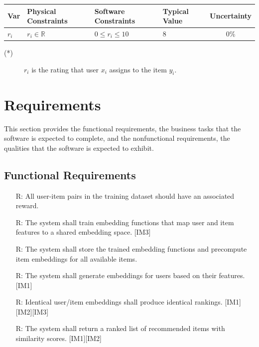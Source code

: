 \documentclass[12pt]{article}
\newcounter{reqnum} %
\begin{document}
\begin{table}[!h]
  \caption{Input Variables} \label{TblInputVar}
  \renewcommand{\arraystretch}{1.2}
\noindent \begin{longtable*}{l l l l c} 
  \toprule
  \textbf{Var} & \textbf{Physical Constraints} & \textbf{Software Constraints} &
                             \textbf{Typical Value} & \textbf{Uncertainty}\\
  \midrule 
  $r_i$ & $r_i \in \mathbb{R}$ & $0 \leq r_i \leq 10$ & 8  & 0\%
  \\
  \bottomrule
\end{longtable*}
\end{table}

\noindent 
\begin{description}
\item[(*)] $r_i$ is the rating that user $x_i$ assigns to the item $y_i$.
\end{description}


\section{Requirements}

This section provides the functional requirements, the business tasks that the
software is expected to complete, and the nonfunctional requirements, the
qualities that the software is expected to exhibit.

\subsection{Functional Requirements}

\noindent \begin{itemize}

\item[R\refstepcounter{reqnum}\thereqnum \label{R_TrainingInputs}:] All user-item pairs in the training dataset should have an associated reward.

\item[R\refstepcounter{reqnum}\thereqnum \label{R_ModelTraining}:] The system shall train embedding functions that map user and item features to a shared embedding space. [IM3]
  
\item[R\refstepcounter{reqnum}\thereqnum \label{R_ModelStorage}:] The system shall store the trained embedding functions and precompute item embeddings for all available items.
  
\item[R\refstepcounter{reqnum}\thereqnum \label{R_UserEmbedding}:] The system shall generate embeddings for users based on their features. [IM1]

\item[R\refstepcounter{reqnum}\thereqnum \label{R_ConsistentRanking}:]
Identical user/item embeddings shall produce identical rankings. [IM1][IM2][IM3]

\item[R\refstepcounter{reqnum}\thereqnum \label{R_Recommendations}:]  The system shall return a ranked list of recommended items with similarity scores. [IM1][IM2]


\end{itemize}
\end{document}
